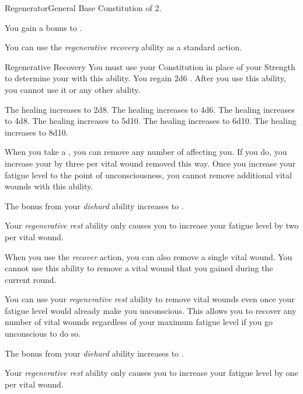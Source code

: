     \begin{feat}{Regenerator}{General}
        \featpre Base Constitution of 2.

         You gain a  bonus to .

         You can use the \textit{regenerative recovery} ability as a standard action.
        \begin{instantability}{Regenerative Recovery}
            \rankline
            You must use your Constitution in place of your Strength to determine your  with this ability.
            You regain 2d6 \add {} .
            After you use this ability, you  cannot use it or any other  ability.

            \rankline
             The healing increases to 2d8.
             The healing increases to 4d6.
             The healing increases to 4d8.
             The healing increases to 5d10.
             The healing increases to 6d10.
             The healing increases to 8d10.
        \end{instantability}

         When you take a , you can remove any number of  affecting you.
        If you do, you increase your  by three per vital wound removed this way.
        Once you increase your fatigue level to the point of unconsciousness, you cannot remove additional vital wounds with this ability.

         The bonus from your \textit{diehard} ability increases to .

         Your \textit{regenerative rest} ability only causes you to increase your fatigue level by two per vital wound.

         When you use the \textit{recover} action, you can also remove a single vital wound.
        You cannot use this ability to remove a vital wound that you gained during the current round.

         You can use your \textit{regenerative rest} ability to remove vital wounds even once your fatigue level would already make you unconscious.
        This allows you to recover any number of vital wounds regardless of your maximum fatigue level if you go unconscious to do so.

         The bonus from your \textit{diehard} ability increases to .

         Your \textit{regenerative rest} ability only causes you to increase your fatigue level by one per vital wound.
    \end{feat}

